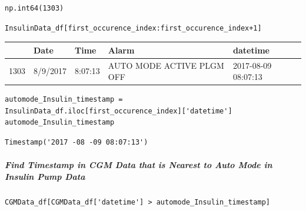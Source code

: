 \begin{verbatim}
np.int64(1303)
\end{verbatim}

\begin{verbatim}
InsulinData_df[first_occurence_index:first_occurence_index+1]
\end{verbatim}

\bigskip\noindent
\begin{tabular}{p{}p{}p{}p{}p{}}
\toprule
 & Date & Time & Alarm & datetime \\
\hline
1303 & 8/9/2017 & 8:07:13 & AUTO MODE ACTIVE PLGM OFF & 2017-08-09 08:07:13 \\
\hline
\bottomrule
\end{tabular}

\bigskip

\begin{verbatim}
automode_Insulin_timestamp = InsulinData_df.iloc[first_occurence_index]['datetime']
automode_Insulin_timestamp
\end{verbatim}

\begin{verbatim}
Timestamp('2017 -08 -09 08:07:13')
\end{verbatim}

\subparagraph{Find Timestamp in CGM Data that is Nearest to Auto Mode in Insulin Pump Data}

\begin{verbatim}
CGMData_df[CGMData_df['datetime'] > automode_Insulin_timestamp]
\end{verbatim}

